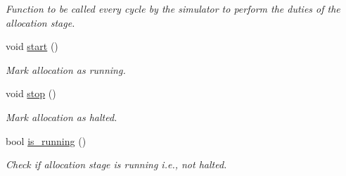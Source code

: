 \begin{DoxyCompactItemize}
\begin{DoxyCompactList}\small\item\em Function to be called every cycle by the simulator to perform the duties of the allocation stage. \item\end{DoxyCompactList}\item 
void \hyperlink{classallocate__c_ae76719e2e9fd554161c2a9f1a6fcfc6e}{start} ()
\begin{DoxyCompactList}\small\item\em Mark allocation as running. \item\end{DoxyCompactList}\item 
void \hyperlink{classallocate__c_aed83638c974670600a0f2041af928727}{stop} ()
\begin{DoxyCompactList}\small\item\em Mark allocation as halted. \item\end{DoxyCompactList}\item 
bool \hyperlink{classallocate__c_ac8f4146d0f3befe3fb4f53e08fd055cc}{is\_\-running} ()
\begin{DoxyCompactList}\small\item\em Check if allocation stage is running i.e., not halted. \item\end{DoxyCompactList}\end{DoxyCompactItemize}
